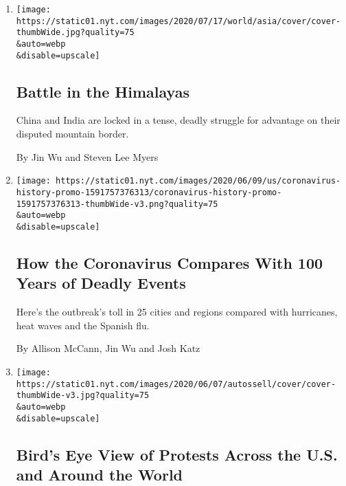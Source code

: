 \begin{enumerate}
\def\labelenumi{\arabic{enumi}.}
\item
  \href{/interactive/2020/07/18/world/asia/china-india-border-conflict.html}{}

  \texttt{[image: https://static01.nyt.com/images/2020/07/17/world/asia/cover/cover-thumbWide.jpg?quality=75\\\&auto=webp\\\&disable=upscale]}

  \hypertarget{battle-in-the-himalayas}{%
  \subsection{Battle in the Himalayas}\label{battle-in-the-himalayas}}

  China and India are locked in a tense, deadly struggle for advantage
  on their disputed mountain border.

  By Jin Wu and Steven Lee Myers
\item
  \href{/interactive/2020/06/10/world/coronavirus-history.html}{}

  \texttt{[image: https://static01.nyt.com/images/2020/06/09/us/coronavirus-history-promo-1591757376313/coronavirus-history-promo-1591757376313-thumbWide-v3.png?quality=75\\\&auto=webp\\\&disable=upscale]}

  \hypertarget{how-the-coronavirus-compares-with-100-years-of-deadly-events}{%
  \subsection{How the Coronavirus Compares With 100 Years of Deadly
  Events}\label{how-the-coronavirus-compares-with-100-years-of-deadly-events}}

  Here's the outbreak's toll in 25 cities and regions compared with
  hurricanes, heat waves and the Spanish flu.

  By Allison McCann, Jin Wu and Josh Katz
\item
  \href{/interactive/2020/06/07/us/george-floyd-protest-aerial-photos.html}{}

  \texttt{[image: https://static01.nyt.com/images/2020/06/07/autossell/cover/cover-thumbWide-v3.jpg?quality=75\\\&auto=webp\\\&disable=upscale]}

  \hypertarget{birds-eye-view-of-protests-across-the-us-and-around-the-world}{%
  \subsection{Bird's Eye View of Protests Across the U.S. and Around the
  World}\label{birds-eye-view-of-protests-across-the-us-and-around-the-world}}


\end{enumerate}
